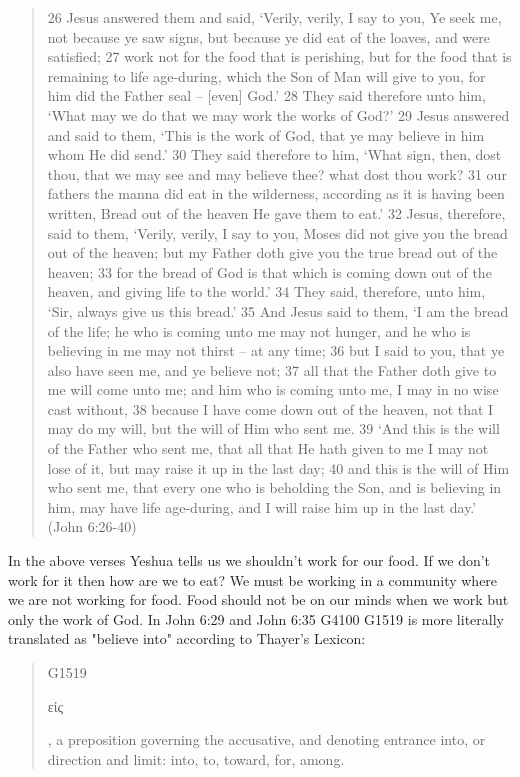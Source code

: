 \documentclass[11pt]{article}
\begin{document}
\begin{quote}
26 Jesus answered them and said, `Verily, verily, I say to you, Ye seek me, not because ye saw signs, but because ye did eat of the loaves, and were satisfied;
27 work not for the food that is perishing, but for the food that is remaining to life age-during, which the Son of Man will give to you, for him did the Father seal -- [even] God.'
28 They said therefore unto him, `What may we do that we may work the works of God?'
29 Jesus answered and said to them, `This is the work of God, that ye may believe in him whom He did send.'
30 They said therefore to him, `What sign, then, dost thou, that we may see and may believe thee? what dost thou work?
31 our fathers the manna did eat in the wilderness, according as it is having been written, Bread out of the heaven He gave them to eat.'
32 Jesus, therefore, said to them, `Verily, verily, I say to you, Moses did not give you the bread out of the heaven; but my Father doth give you the true bread out of the heaven;
33 for the bread of God is that which is coming down out of the heaven, and giving life to the world.'
34 They said, therefore, unto him, `Sir, always give us this bread.'
35 And Jesus said to them, `I am the bread of the life; he who is coming unto me may not hunger, and he who is believing in me may not thirst -- at any time;
36 but I said to you, that ye also have seen me, and ye believe not;
37 all that the Father doth give to me will come unto me; and him who is coming unto me, I may in no wise cast without,
38 because I have come down out of the heaven, not that I may do my will, but the will of Him who sent me.
39 `And this is the will of the Father who sent me, that all that He hath given to me I may not lose of it, but may raise it up in the last day;
40 and this is the will of Him who sent me, that every one who is beholding the Son, and is believing in him, may have life age-during, and I will raise him up in the last day.' (John 6:26-40)
\end{quote}

In the above verses Yeshua tells us we shouldn't work for our food. If we don't work for it then how are we to eat? We must be working in a community where we are not working for food. Food should not be on our minds when we work but only the work of God. In John 6:29 and John 6:35 G4100 G1519 is more literally translated as "believe into" according to Thayer's Lexicon: 
\begin{quote}
G1519 \begin{greek} εἰς \end{greek}, a preposition governing the accusative, and denoting entrance into, or direction and limit: into, to, toward, for, among.
\end{quote}
\end{document}

